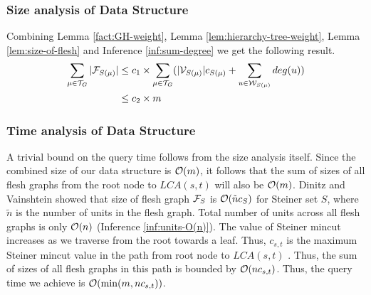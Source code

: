 \subsubsection*{Size analysis of Data Structure}
Combining Lemma \ref{fact:GH-weight}, Lemma \ref{lem:hierarchy-tree-weight}, Lemma \ref{lem:size-of-flesh} and Inference \ref{inf:sum-degree} we get the following result.
\begin{equation*}
    \begin{split}
        \nonumber
        \sum_{\mu \in {\cal T}_G}|{\cal F}_{S(\mu)}| &\leq c_1 \times \sum_{\mu \in {\cal T}_G} (|{\cal V}_{S(\mu)}|c_{S(\mu)} + \sum_{u\in {\cal W}_{S(\mu)}}deg(u))\\
        &\leq c_2 \times m
    \end{split}
\end{equation*}


\subsubsection*{Time analysis of Data Structure}

A trivial bound on the query time follows from the size analysis itself. Since the combined size of our data structure is ${\cal O}(m)$, it follows that the sum of sizes of all flesh graphs from the root node to $LCA(s,t)$ will also be ${\cal O}(m)$. Dinitz and Vainshtein \cite{DBLP:conf/stoc/DinitzV94} showed that size of flesh graph ${\cal F}_S$ is ${\cal O}(\tilde{n}c_S)$ for Steiner set $S$, where $\tilde{n}$ is the number of units in the flesh graph. Total number of units across all flesh graphs is only ${\cal O}(n)$ (Inference \ref{inf:units-O(n)}). The value of Steiner mincut increases as we traverse from the root towards a leaf. Thus, $c_{s,t}$ is the maximum Steiner mincut value in the path from root node to $LCA(s,t)$ . Thus, the sum of sizes of all flesh graphs in this path is bounded by ${\cal O}(nc_{s,t})$. Thus, the query time we achieve is ${\cal O}(\min(m,nc_{s,t}))$.